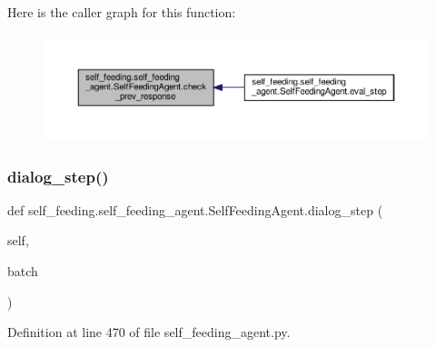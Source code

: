 Here is the caller graph for this function\+:
\nopagebreak
\begin{figure}[H]
\begin{center}
\leavevmode
\includegraphics[width=350pt]{classself__feeding_1_1self__feeding__agent_1_1SelfFeedingAgent_a7dc80f7fcb8270b3fb87ddff8848750d_icgraph}
\end{center}
\end{figure}
\mbox{\label{classself__feeding_1_1self__feeding__agent_1_1SelfFeedingAgent_a761c50309d11237b261a3600923964c9}} 
\subsubsection{\texorpdfstring{dialog\+\_\+step()}{dialog\_step()}}
{\footnotesize\ttfamily def self\+\_\+feeding.\+self\+\_\+feeding\+\_\+agent.\+Self\+Feeding\+Agent.\+dialog\+\_\+step (\begin{DoxyParamCaption}\item[{}]{self,  }\item[{}]{batch }\end{DoxyParamCaption})}



Definition at line 470 of file self\+\_\+feeding\+\_\+agent.\+py.



